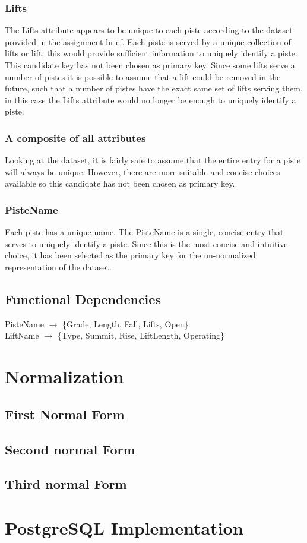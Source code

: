 \documentclass[titlepage ,12pt]{article}
\begin{document}
\subsubsection{Lifts}

The Lifts attribute appears to be unique to each piste according to the dataset provided in the assignment brief. Each piste is served by a unique collection of lifts or lift, this would provide sufficient information to uniquely identify a piste. \\
This candidate key has not been chosen as primary key. Since some lifts serve a number of pistes it is possible to assume that a lift could be removed in the future, such that a number of pistes have the exact same set of lifts serving them, in this case the Lifts attribute would no longer be enough to uniquely identify a piste.

\subsubsection{A composite of all attributes}

Looking at the dataset, it is fairly safe to assume that the entire entry for a piste will always be unique. However, there are more suitable and concise choices available so this candidate has not been chosen as primary key.

\subsubsection{PisteName}

Each piste has a unique name. The PisteName is a single, concise entry that serves to uniquely identify a piste. Since this is the most concise and intuitive choice, it has been selected as the primary key for the un-normalized representation of the dataset. 


\subsection{Functional Dependencies}
PisteName \begin{math}\rightarrow\end{math} \{Grade, Length, Fall, Lifts, Open\} \\
LiftName \begin{math}\rightarrow\end{math} \{Type, Summit, Rise, LiftLength, Operating\}
 






\section{Normalization}
\subsection{First Normal Form}
\subsection{Second normal Form}
\subsection{Third normal Form}

\section{PostgreSQL Implementation}
\end{document}

